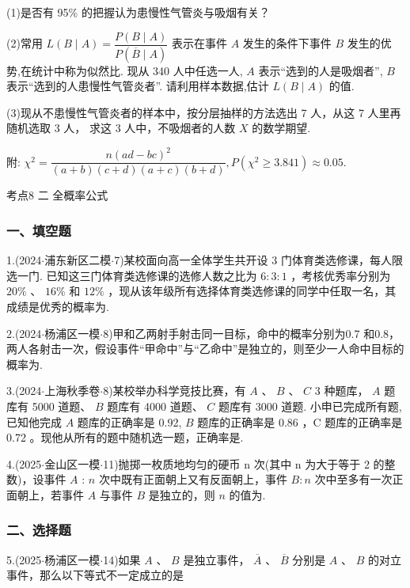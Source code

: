 (1)是否有 95\% 的把握认为患慢性气管炎与吸烟有关？

(2)常用 $L\left( {B \mid  A}\right)  = \dfrac{P\left( {B \mid  A}\right) }{P\left( {\overline{B} \mid  A}\right) }$ 表示在事件 $A$ 发生的条件下事件 $B$ 发生的优势,在统计中称为似然比. 现从 340 人中任选一人, $A$ 表示“选到的人是吸烟者”, $B$ 表示“选到的人患慢性气管炎者”. 请利用样本数据,估计 $L\left( {B \mid  A}\right)$ 的值.

(3)现从不患慢性气管炎者的样本中，按分层抽样的方法选出 7 人，从这 7 人里再随机选取 3 人， 求这 3 人中，不吸烟者的人数 $X$ 的数学期望.

附: ${\chi }^{2} = \dfrac{n{\left( ad - bc\right) }^{2}}{\left( {a + b}\right) \left( {c + d}\right) \left( {a + c}\right) \left( {b + d}\right) },P\left( {{\chi }^{2} \geq  {3.841}}\right)  \approx  {0.05}$.

考点8 二 全概率公式

\subsubsection*{一、填空题}

1.(2024$\cdot$浦东新区二模$\cdot$7)某校面向高一全体学生共开设 3 门体育类选修课，每人限选一门. 已知这三门体育类选修课的选修人数之比为 $6 : 3 : 1$ ，考核优秀率分别为 ${20}\%$ 、 ${16}\%$ 和 ${12}\%$ ，现从该年级所有选择体育类选修课的同学中任取一名，其成绩是优秀的概率为\blkda[2]{}.

2.(2024$\cdot$杨浦区一模$\cdot$8)甲和乙两射手射击同一目标，命中的概率分别为0.7 和0.8，两人各射击一次，假设事件“甲命中”与“乙命中”是独立的，则至少一人命中目标的概率为\blkda[2]{}.

3.(2024$\cdot$上海秋季卷$\cdot$8)某校举办科学竞技比赛，有 $A$ 、 $B$ 、 $C$ 3 种题库， $A$ 题库有 5000 道题、 $B$ 题库有 4000 道题、 $C$ 题库有 3000 道题. 小申已完成所有题,已知他完成 $A$ 题库的正确率是 0.92, $B$ 题库的正确率是 0.86 ，C 题库的正确率是 0.72 。现他从所有的题中随机选一题，正确率是\blkda[2]{}.

4.(2025$\cdot$金山区一模$\cdot$11)抛掷一枚质地均匀的硬币 n 次(其中 n 为大于等于 2 的整数)，设事件 $A$ : $n$ 次中既有正面朝上又有反面朝上，事件 $B : n$ 次中至多有一次正面朝上，若事件 $A$ 与事件 $B$ 是独立的，则 $n$ 的值为\blkda[2]{}.

\subsubsection*{二、选择题}

5.(2025$\cdot$杨浦区一模$\cdot$14)如果 $A$ 、 $B$ 是独立事件， $\overline{A}$ 、 $\overline{B}$ 分别是 $A$ 、 $B$ 的对立事件，那么以下等式不一定成立的是 \dotfill{(\kh{})}

